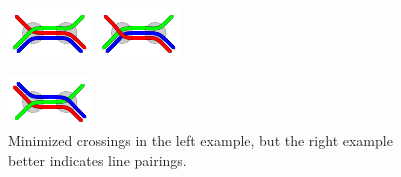 \documentclass[format=acmsmall, review=false, screen=true]{acmart}
\begin{document}
\begin{figure}[t]
\centering
\begin{minipage}{.48\textwidth}
  \centering
  \includegraphics[trim={2.25 2.2 2.25 2.2},clip,width=.45\textwidth]{render_examples/splitting_example_nonopt.pdf}\hfill
  \includegraphics[trim={2.25 2.2 2.25 2.2},clip,width=.45\textwidth]{render_examples/splitting_example.pdf}
  \caption{Minimized crossings in the left example, but the right example better indicates line pairings.}
  \label{FIG:linesplitting}
\end{minipage}%
\hfill
\begin{minipage}{.48\textwidth}
  \centering
  \includegraphics[trim={2.25 2.2 2.25 2.2},clip,width=.45\textwidth]{render_examples/splitting_example2_nonopt.pdf}\hfill

\end{minipage}
\end{figure}
\end{document}
